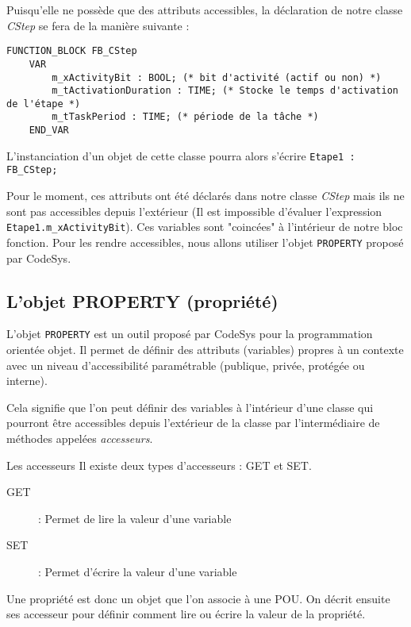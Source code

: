 \begin{UPSTIidee}{}
    Puisqu'elle ne possède que des attributs accessibles, la déclaration de notre classe \emph{CStep} se fera de la manière suivante :
    \begin{lstlisting}
FUNCTION_BLOCK FB_CStep
    VAR
        m_xActivityBit : BOOL; (* bit d'activité (actif ou non) *)
        m_tActivationDuration : TIME; (* Stocke le temps d'activation de l'étape *)
        m_tTaskPeriod : TIME; (* période de la tâche *)
    END_VAR\end{lstlisting}

    L'instanciation d'un objet de cette classe pourra alors s'écrire \lstinline{Etape1 : FB_CStep;}

    Pour le moment, ces attributs ont été déclarés dans notre classe \emph{CStep} mais ils ne sont pas accessibles depuis l'extérieur (Il est impossible d'évaluer l'expression \lstinline{Etape1.m_xActivityBit}). Ces variables sont "coincées" à l'intérieur de notre bloc fonction. Pour les rendre accessibles, nous allons utiliser l'objet \lstinline{PROPERTY} proposé par CodeSys. 
\end{UPSTIidee}

\subsection{L'objet PROPERTY (propriété)}
L'objet \lstinline{PROPERTY} est un outil proposé par CodeSys pour la programmation orientée objet. Il permet de définir des attributs (variables) propres à un contexte avec un niveau d'accessibilité paramétrable (publique, privée, protégée ou interne).

Cela signifie que l'on peut définir des variables à l'intérieur d'une classe qui pourront être accessibles depuis l'extérieur de la classe par l'intermédiaire de méthodes appelées \emph{accesseurs}.

\begin{UPSTIinfor}{Les accesseurs}
    Il existe deux types d'accesseurs : GET et SET. 
    \begin{description}
        \item[GET] : Permet de lire la valeur d'une variable
        \item[SET] : Permet d'écrire la valeur d'une variable
    \end{description}
\end{UPSTIinfor}

Une propriété est donc un objet que l'on associe à une POU. On décrit ensuite ses accesseur pour définir comment lire ou écrire la valeur de la propriété.

